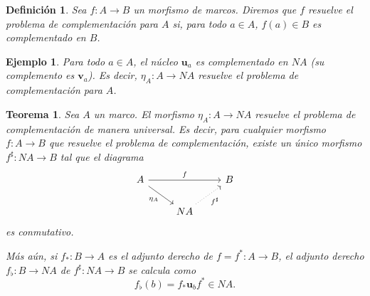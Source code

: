 \documentclass[12pt,letterpaper,titlepage]{article}
\newtheorem*{defn}{Definición}
\newtheorem*{exa}{Ejemplo}
\newtheorem*{thm}{Teorema}
\theoremstyle{definition}
\newcommand\unuc[1]{\mathbf u_{#1}}
\newcommand\vnuc[1]{\mathbf v_{#1}}
\newcommand\<{\langle}
\renewcommand\>{\rangle}
\begin{document}
\begin{defn}
  Sea $f:A\to B$ un morfismo de marcos.
  Diremos que $f$ resuelve el problema de complementación para
  $A$ si, para todo $a\in A$, $f(a)\in B$ es complementado en
  $B$.
\end{defn}
\begin{exa}
  Para todo $a\in A$, el núcleo $\unuc a$ es complementado en
  $NA$ (su complemento es $\vnuc a$).
  Es decir, $\eta_A:A\to NA$ resuelve el problema de
  complementación para $A$.
\end{exa}

\begin{thm}
  Sea $A$ un marco.
  El morfismo $\eta_A:A\to NA$ resuelve el problema de
  complementación de manera universal.
  Es decir, para cualquier morfismo $f:A\to B$ que resuelve el
  problema de complementación, existe un único morfismo
  $f^\sharp:NA\to B$ tal que el diagrama
  \[
    \begin{tikzcd}
      A \ar[dr,"\eta_A"'] \ar[rr,"f"] && B \\
      & NA \ar[ur,"f^\sharp"',dotted]
    \end{tikzcd}
  \]
  es conmutativo.

  Más aún, si $f_*:B\to A$ es el adjunto derecho de $f=f^*:A\to
  B$, el adjunto derecho $f_\flat:B\to NA$ de $f^\sharp:NA\to B$
  se calcula como
  \[
    f_\flat(b) = f_*\unuc b f^* \in NA
  .\]
\end{thm}
\end{document}
